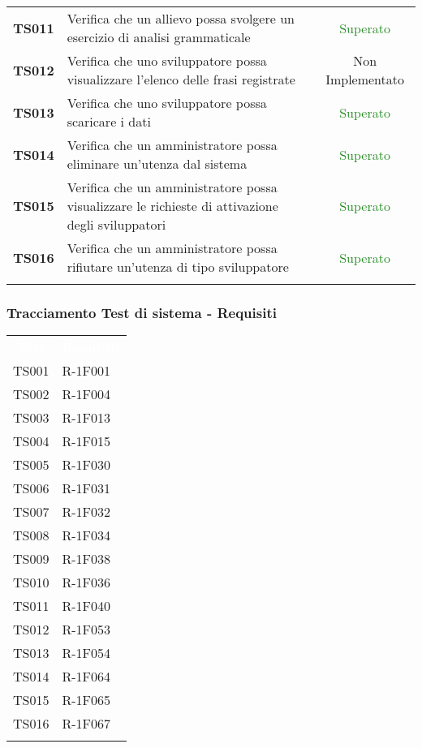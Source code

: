 \begin{tabularx}{\textwidth}{cXc}
	\textbf{TS011} & Verifica che un allievo possa svolgere un esercizio di analisi grammaticale & \textcolor{ForestGreen}{Superato} \\
	\textbf{TS012} & Verifica che uno sviluppatore possa visualizzare l’elenco delle frasi registrate & Non Implementato \\
	\textbf{TS013} & Verifica che uno sviluppatore possa scaricare i dati & \textcolor{ForestGreen}{Superato} \\
	\textbf{TS014} & Verifica che un amministratore possa eliminare un'utenza dal sistema & \textcolor{ForestGreen}{Superato} \\
	\textbf{TS015} & Verifica che un amministratore possa visualizzare le richieste di attivazione degli sviluppatori & \textcolor{ForestGreen}{Superato} \\
	\textbf{TS016} & Verifica che un amministratore possa rifiutare un'utenza di tipo sviluppatore & \textcolor{ForestGreen}{Superato} \\
	
	\rowcolor{white}
	\caption{Test di sistema}
	\label{tab:tabellatestsistema}
\end{tabularx}


\subsubsection{Tracciamento Test di sistema - Requisiti}

\begin{tabularx}{\textwidth}{cX}
	
	\rowcolor{greySWEight}
	
	\rowcolor{greySWEight}
	\textcolor{white}{\textbf{Test}} & 
	\textcolor{white}{\textbf{Requisiti}} \\
	
	TS001 & R-1F001 \\
	TS002 & R-1F004 \\
	TS003 & R-1F013 \\
	TS004 & R-1F015 \\
	TS005 & R-1F030 \\
	TS006 & R-1F031 \\
	TS007 & R-1F032 \\
	TS008 & R-1F034 \\
	TS009 & R-1F038 \\
	TS010 & R-1F036 \\
	TS011 & R-1F040 \\
	TS012 & R-1F053 \\
	TS013 & R-1F054 \\
	TS014 & R-1F064 \\
	TS015 & R-1F065 \\
	TS016 & R-1F067 \\
	
	\rowcolor{white}
	\caption{Tracciamento test di sistema - requisiti}
	\label{tab:tracciamentotestsistema}
\end{tabularx}
